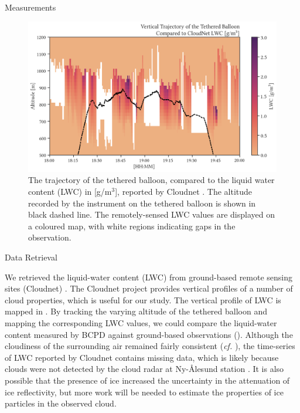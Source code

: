 \documentclass[final]{beamer}
\newlength{\colwidth}
\begin{document}
\begin{frame}[t]
\begin{columns}[t]
\begin{column}{\colwidth}
\begin{block}{Measurements}
        \begin{figure}
          \centering
          \includegraphics[width=0.95\colwidth]{img/ts_alt.png}
          \caption{The trajectory of the tethered balloon, compared to the liquid water content (LWC) in [g/m$^3$], reported by Cloudnet \cite{illingworth2007cloudnet}. The altitude recorded by the instrument on the tethered balloon is shown in black dashed line. The remotely-sensed LWC values are displayed on a coloured map, with white regions indicating gaps in the observation.}
          \label{fig:02}
        \end{figure}

      \end{block}

      \begin{exampleblock}{Data Retrieval}

        We retrieved the liquid-water content (LWC) from ground-based remote sensing sites (Cloudnet) \cite{illingworth2007cloudnet}. The Cloudnet project provides vertical profiles of a number of cloud properties, which is useful for our study. The vertical profile of LWC is mapped in . By tracking the varying altitude of the tethered balloon and mapping the corresponding LWC values, we could compare the liquid-water content measured by BCPD against ground-based observations (). Although the cloudiness of the surrounding air remained fairly consistent (\emph{cf.} ), the time-series of LWC reported by Cloudnet contains missing data, which is likely because clouds were not detected by the cloud radar at Ny-\r{A}lesund station \cite{illingworth2007cloudnet}. It is also possible that the presence of ice increased the uncertainty in the attenuation of ice reflectivity, but more work will be needed to estimate the properties of ice particles in the observed cloud.


\end{exampleblock}
\end{column}
\end{columns}
\end{frame}
\end{document}
